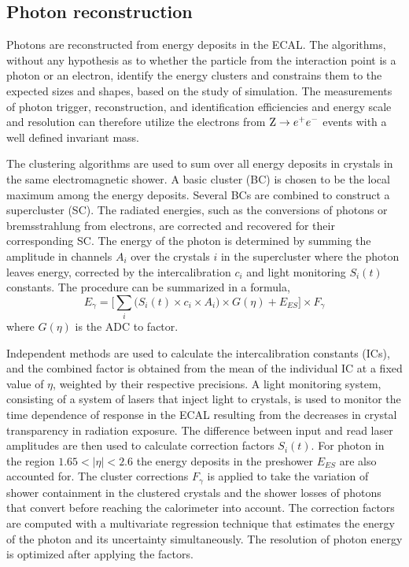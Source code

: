 \subsection*{Photon reconstruction}
		Photons are reconstructed from energy deposits in the ECAL. The algorithms, without any hypothesis as to whether the particle from the interaction point is a photon or an electron, identify the energy clusters and constrains them to the expected sizes and shapes, based on the study of simulation. The measurements of photon trigger, reconstruction, and identification efficiencies and energy scale and resolution can therefore utilize the electrons from $\mathrm{Z}\to e^{+}e^{-}$ events with a well defined invariant mass. 
		
		The clustering algorithms are used to sum over all energy deposits in crystals in the same electromagnetic shower. A basic cluster (BC) is chosen to be the local maximum among the energy deposits. Several BCs are combined to construct a supercluster (SC). The radiated energies, such as the conversions of photons or bremsstrahlung from electrons, are corrected and recovered for their corresponding SC.
		The energy of the photon is determined by summing the amplitude in channels $\mathit{A_{i}}$ over the crystals $i$ in the supercluster where the photon leaves energy, corrected by the intercalibration $\mathit{c_{i}}$ and light monitoring $\mathit{S_{i}(t)}$ constants. The procedure can be summarized in a formula,
		\begin{equation}
		\mathit{E_{\gamma}} = \bigg[ \sum_{i} \bigg(\mathit{S_{i}(t)} \times \mathit{c_{i}} \times \mathit{A_{i}}\bigg) \times \mathit{G}(\eta) + \mathit{E_{ES}} \bigg] \times \mathit{F_{\gamma}}
		\end{equation}
	where $\mathit{G}(\eta)$ is the ADC to \GeV factor. 
		
		Independent methods are used to calculate the intercalibration constants (ICs), and the combined factor is obtained from the mean of the individual IC at a fixed value of $\eta$, weighted by their respective precisions. A light monitoring system, consisting of a system of lasers that inject light to crystals, is used to monitor the time dependence of response in the ECAL resulting from the decreases in crystal transparency in radiation exposure. The difference between input and read laser amplitudes are then used to calculate correction factors $\mathit{S_{i}(t)}$.
		For photon in the region $1.65<|\eta|< 2.6$ the energy deposits in the preshower $\mathit{E_{ES}}$ are also accounted for. 
		The cluster corrections $\mathit{F_{\gamma}}$ is applied to take the variation of shower containment in the clustered crystals and the shower losses of photons that convert before reaching the calorimeter into account. The correction factors are computed with a multivariate regression technique that estimates the energy of the photon and its uncertainty simultaneously. The resolution of photon energy is optimized after applying the factors.
		
